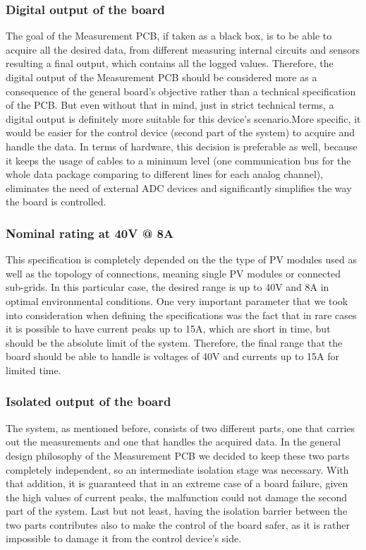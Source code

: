 \subsubsection{Digital output of the board}
The goal of the Measurement PCB, if taken as a black box, is to be able to acquire all the desired data, from different measuring internal circuits and sensors resulting a final output, which contains all the logged values. Therefore, the digital output of the Measurement PCB should be considered more as a consequence of the general board's objective rather than a technical specification of the PCB. But even without that in mind, just in strict technical terms, a digital output is definitely more suitable for this device's scenario.More specific, it would be easier for the control device (second part of the system) to acquire and handle the data. In terms of hardware, this decision is preferable as well, because it keeps the usage of cables to a minimum level (one communication bus for the whole data package comparing to different lines for each analog channel), eliminates the need of external ADC devices and significantly simplifies the way the board is controlled. 

\subsubsection{Nominal rating at 40V @ 8A}
This specification is completely depended on the the type of PV modules used as well as the topology of connections, meaning single PV modules or connected sub-grids. In this particular case, the desired range is up to 40V and 8A in optimal environmental conditions. One very important parameter that we took into consideration when defining the specifications was the fact that in rare cases it is possible to have current peaks up to 15A, which are short in time, but should be the absolute limit of the system. Therefore, the final range that the board should be able to handle is voltages of 40V and currents up to 15A for limited time.

\subsubsection{Isolated output of the board}
The system, as mentioned before, consists of two different parts, one that carries out the measurements and one that handles the acquired data. In the general design philosophy of the Measurement PCB we decided to keep these two parts completely independent, so an intermediate isolation stage was necessary. With that addition, it is guaranteed that in an extreme case of a board failure, given the high values of current peaks, the malfunction could not damage the second part of the system. Last but not least, having the isolation barrier between the two parts contributes also to make the control of the board safer, as it is rather impossible to damage it from the control device's side.


